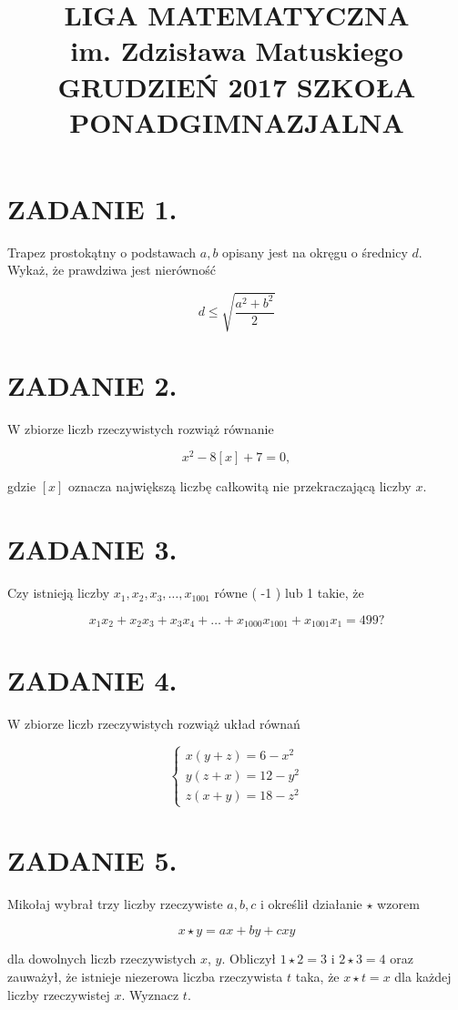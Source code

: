 \documentclass[10pt]{article}
\title{LIGA MATEMATYCZNA \\
 im. Zdzisława Matuskiego GRUDZIEŃ 2017 SZKOŁA PONADGIMNAZJALNA }
\author{}
\date{}
\begin{document}
\maketitle
\section*{ZADANIE 1.}
Trapez prostokątny o podstawach \(a, b\) opisany jest na okręgu o średnicy \(d\). Wykaż, że prawdziwa jest nierówność

\[
d \leqslant \sqrt{\frac{a^{2}+b^{2}}{2}}
\]

\section*{ZADANIE 2.}
W zbiorze liczb rzeczywistych rozwiąż równanie

\[
x^{2}-8[x]+7=0,
\]

gdzie \([x]\) oznacza największą liczbę całkowitą nie przekraczającą liczby \(x\).

\section*{ZADANIE 3.}
Czy istnieją liczby \(x_{1}, x_{2}, x_{3}, \ldots, x_{1001}\) równe ( -1 ) lub 1 takie, że

\[
x_{1} x_{2}+x_{2} x_{3}+x_{3} x_{4}+\ldots+x_{1000} x_{1001}+x_{1001} x_{1}=499 ?
\]

\section*{ZADANIE 4.}
W zbiorze liczb rzeczywistych rozwiąż układ równań

\[
\left\{\begin{array}{l}
x(y+z)=6-x^{2} \\
y(z+x)=12-y^{2} \\
z(x+y)=18-z^{2}
\end{array}\right.
\]

\section*{ZADANIE 5.}
Mikołaj wybrał trzy liczby rzeczywiste \(a, b, c\) i określił działanie \(\star\) wzorem

\[
x \star y=a x+b y+c x y
\]

dla dowolnych liczb rzeczywistych \(x\), \(y\). Obliczył \(1 \star 2=3\) i \(2 \star 3=4\) oraz zauważył, że istnieje niezerowa liczba rzeczywista \(t\) taka, że \(x \star t=x\) dla każdej liczby rzeczywistej \(x\). Wyznacz \(t\).
\end{document}
